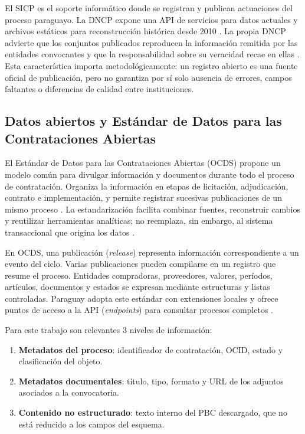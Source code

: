 El SICP es el soporte informático donde se registran y publican actuaciones del proceso paraguayo. La DNCP expone una API de servicios para datos actuales y archivos estáticos para reconstrucción histórica desde 2010 \parencite{dncpOpenContracting}. La propia DNCP advierte que los conjuntos publicados reproducen la información remitida por las entidades convocantes y que la responsabilidad sobre su veracidad recae en ellas \parencite{dncpDatosAbiertos}. Esta característica importa metodológicamente: un registro abierto es una fuente oficial de publicación, pero no garantiza por sí solo ausencia de errores, campos faltantes o diferencias de calidad entre instituciones.

\subsection{Datos abiertos y Estándar de Datos para las Contrataciones Abiertas}

El Estándar de Datos para las Contrataciones Abiertas (OCDS) propone un modelo común para divulgar información y documentos durante todo el proceso de contratación. Organiza la información en etapas de licitación, adjudicación, contrato e implementación, y permite registrar sucesivas publicaciones de un mismo proceso \parencite{ocdsPrimer,ocdsReference}. La estandarización facilita combinar fuentes, reconstruir cambios y reutilizar herramientas analíticas; no reemplaza, sin embargo, al sistema transaccional que origina los datos \parencite{ocdsDataStandard}.

En OCDS, una publicación (\textit{release}) representa información correspondiente a un evento del ciclo. Varias publicaciones pueden compilarse en un registro que resume el proceso. Entidades compradoras, proveedores, valores, períodos, artículos, documentos y estados se expresan mediante estructuras y listas controladas. Paraguay adopta este estándar con extensiones locales y ofrece puntos de acceso a la API (\textit{endpoints}) para consultar procesos completos \parencite{dncpOpenContracting,dncpDatosAbiertos}.

Para este trabajo son relevantes 3 niveles de información:

\begin{enumerate}
  \item \textbf{Metadatos del proceso}: identificador de contratación, OCID, estado y clasificación del objeto.
  \item \textbf{Metadatos documentales}: título, tipo, formato y URL de los adjuntos asociados a la convocatoria.
  \item \textbf{Contenido no estructurado}: texto interno del PBC descargado, que no está reducido a los campos del esquema.
\end{enumerate}

